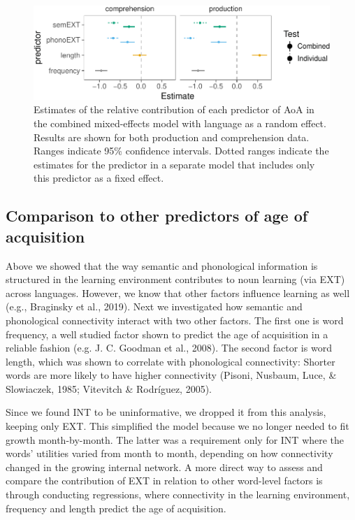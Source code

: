 \documentclass[english,floatsintext,man]{apa6}
\theoremstyle{definition}
\theoremstyle{definition}
\theoremstyle{definition}
\theoremstyle{remark}
\begin{document}
\begin{figure}[!h]
\includegraphics[width=\textwidth]{ms_files/figure-latex/staticAll-1} \caption{Estimates of the relative contribution of each predictor of AoA in the combined mixed-effects model with language as a random effect. Results are shown for both production and comprehension data. Ranges indicate 95\% confidence intervals. Dotted ranges indicate the estimates for the predictor in a separate model that includes only this predictor as a fixed effect.}\label{fig:staticAll}
\end{figure}

\subsection{Comparison to other predictors of age of
acquisition}\label{comparison-to-other-predictors-of-age-of-acquisition}

Above we showed that the way semantic and phonological information is
structured in the learning environment contributes to noun learning (via
EXT) across languages. However, we know that other factors influence
learning as well (e.g., Braginsky et al., 2019). Next we investigated
how semantic and phonological connectivity interact with two other
factors. The first one is word frequency, a well studied factor shown to
predict the age of acquisition in a reliable fashion (e.g. J. C. Goodman
et al., 2008). The second factor is word length, which was shown to
correlate with phonological connectivity: Shorter words are more likely
to have higher connectivity (Pisoni, Nusbaum, Luce, \& Slowiaczek, 1985;
Vitevitch \& Rodríguez, 2005).

Since we found INT to be uninformative, we dropped it from this
analysis, keeping only EXT. This simplified the model because we no
longer needed to fit growth month-by-month. The latter was a requirement
only for INT where the words' utilities varied from month to month,
depending on how connectivity changed in the growing internal network. A
more direct way to assess and compare the contribution of EXT in
relation to other word-level factors is through conducting regressions,
where connectivity in the learning environment, frequency and length
predict the age of acquisition.
\end{document}
